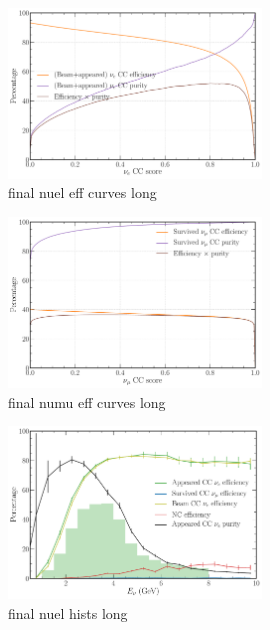 \begin{figure} %
    \includegraphics[width=0.6\textwidth]{diagrams/7-cvn/chipsnet/final_nuel_eff_curves.pdf}
    \caption[final nuel eff curves short]
    {final nuel eff curves long}
    \label{fig:final_nuel_eff_curves}
\end{figure}

\begin{figure} %
    \includegraphics[width=0.6\textwidth]{diagrams/7-cvn/chipsnet/final_numu_eff_curves.pdf}
    \caption[final numu eff curves short]
    {final numu eff curves long}
    \label{fig:final_numu_eff_curves}
\end{figure}

\begin{figure} %
    \includegraphics[width=0.6\textwidth]{diagrams/7-cvn/chipsnet/final_nuel_hists.pdf}
    \caption[final nuel hists short]
    {final nuel hists long}
    \label{fig:final_nuel_hists}
\end{figure}

